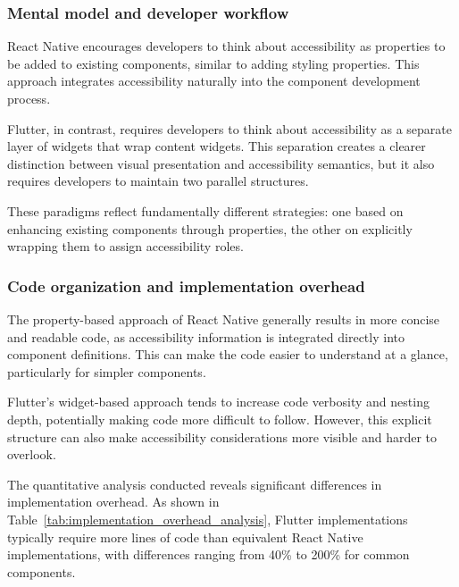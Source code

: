 \subsubsection{Mental model and developer workflow}
React Native encourages developers to think about accessibility as properties to be added to existing components, similar to adding styling properties. This approach integrates accessibility naturally into the component development process.

Flutter, in contrast, requires developers to think about accessibility as a separate layer of widgets that wrap content widgets. This separation creates a clearer distinction between visual presentation and accessibility semantics, but it also requires developers to maintain two parallel structures.

These paradigms reflect fundamentally different strategies: one based on enhancing existing components through properties, the other on explicitly wrapping them to assign accessibility roles.

\subsubsection{Code organization and implementation overhead}
The property-based approach of React Native generally results in more concise and readable code, as accessibility information is integrated directly into component definitions. This can make the code easier to understand at a glance, particularly for simpler components.

Flutter's widget-based approach tends to increase code verbosity and nesting depth, potentially making code more difficult to follow. However, this explicit structure can also make accessibility considerations more visible and harder to overlook.

The quantitative analysis conducted reveals significant differences in implementation overhead. As shown in Table~\ref{tab:implementation_overhead_analysis}, Flutter implementations typically require more lines of code than equivalent React Native implementations, with differences ranging from 40\% to 200\% for common components.

